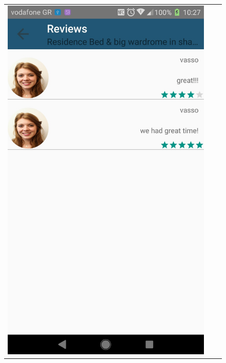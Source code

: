 \documentclass[12pt]{article}
\begin{document}
	\begin{center}
		\begin{figure}
			\begin{tabular}{c c c}
				
				\includegraphics[scale=0.16, keepaspectratio]{14-reviews.jpg}  
				&

\end{tabular}
\end{figure}
\end{center}
\end{document}
